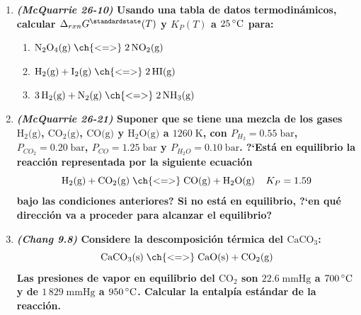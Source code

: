 \documentclass[a4paper,12pt]{article}
\begin{document}
\begin{enumerate}
 \item \textbf{\textit{(McQuarrie 26-10)} Usando una tabla de datos termodin\'amicos, calcular $\Delta_{rxn}G^\standardstate(T)$ y $K_P(T)$ a $25\,\celsius$ para:}
 \begin{enumerate}
  \item $\mbox{N}_2\mbox{O}_4\mbox{(g)}\;\ch{ <=> }\;2\,\mbox{NO}_2\mbox{(g)}$


  \item $\mbox{H}_2\mbox{(g)}+\mbox{I}_2\mbox{(g)}\;\ch{ <=> }\;2\,\mbox{HI(g)}$


  \item $3\,\mbox{H}_2\mbox{(g)}+\mbox{N}_2\mbox{(g)}\;\ch{ <=> }\;2\,\mbox{NH}_3\mbox{(g)}$


 \end{enumerate} %

 \item \textbf{\textit{(McQuarrie 26-21)} Suponer que se tiene una mezcla de los gases $\mbox{H}_2\mbox{(g)}$, $\mbox{CO}_2\mbox{(g)}$, $\mbox{CO(g)}$ y $\mbox{H}_2\mbox{O(g)}$ a $1260\;\mbox{K}$, con $P_{H_2}=0.55\;\mbox{bar}$, $P_{CO_2}=0.20\;\mbox{bar}$, $P_{CO}=1.25\;\mbox{bar}$ y $P_{H_2O}=0.10\;\mbox{bar}$. ?`Est\'a en equilibrio la reacci\'on representada por la siguiente ecuaci\'on}
$$\mbox{H}_2\mbox{(g)}+\mbox{CO}_2\mbox{(g)}\;\ch{ <=> }\;\mbox{CO(g)}+\mbox{H}_2\mbox{O(g)}\;\;\;\;K_P=1.59$$
\textbf{bajo las condiciones anteriores? Si no est\'a en equilibrio, ?`en qu\'e direcci\'on va a proceder para alcanzar el equilibrio?} %



 \item \textbf{\textit{(Chang 9.8)} Considere la descomposici\'on t\'ermica del $\mbox{CaCO}_3$:}
$$\mbox{CaCO}_3\mbox{(s)}\;\ch{ <=> }\;\mbox{CaO(s)}+\mbox{CO}_2\mbox{(g)}$$
\textbf{Las presiones de vapor en equilibrio del $\mbox{CO}_2$ son $22.6\;\mbox{mmHg}$ a $700\,\celsius$ y de $1\,829\;\mbox{mmHg}$ a $950\,\celsius$. Calcular la entalp\'ia est\'andar de la reacci\'on.} %



\end{enumerate}
 
\end{document}
